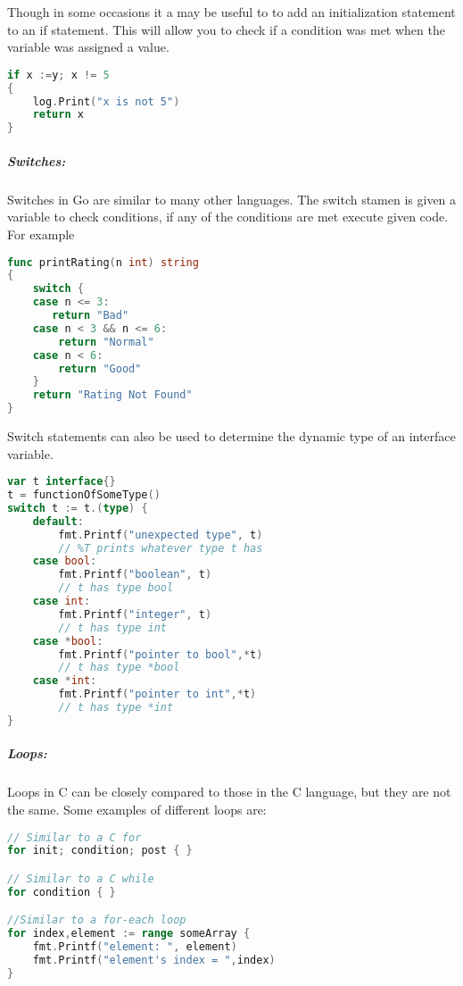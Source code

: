 Though in some occasions it a may be useful to to add an initialization statement to an if statement. This will allow you to check if a condition was met when the variable was assigned a value.
\begin{lstlisting}[language=Go]
if x :=y; x != 5 
{
    log.Print("x is not 5")
    return x
}
\end{lstlisting}
\subparagraph{Switches:}
Switches in Go are similar to many other languages. The switch stamen is given a variable to check conditions, if any of the conditions are met execute given code. For example
\begin{lstlisting}[language=Go]
func printRating(n int) string
{
    switch {
    case n <= 3:
       return "Bad"
    case n < 3 && n <= 6:
        return "Normal"
    case n < 6:
        return "Good"
    }
    return "Rating Not Found"
}
\end{lstlisting}
Switch statements can also be used to determine the dynamic type of an interface variable.\cite{website:go-lang-documentation}
\begin{lstlisting}[language=Go]
var t interface{}
t = functionOfSomeType()
switch t := t.(type) {
    default:
        fmt.Printf("unexpected type", t)     
        // %T prints whatever type t has
    case bool:
        fmt.Printf("boolean", t)             
        // t has type bool
    case int:
        fmt.Printf("integer", t)             
        // t has type int
    case *bool:
        fmt.Printf("pointer to bool",*t) 
        // t has type *bool
    case *int:
        fmt.Printf("pointer to int",*t) 
        // t has type *int
}
\end{lstlisting}
\subparagraph{Loops:} 
Loops in C can be closely compared to those in the C language, but they are not the same. Some  examples of different loops are: \cite{website:go-lang-documentation}
\begin{lstlisting}[language=Go]
// Similar to a C for
for init; condition; post { }

// Similar to a C while
for condition { }

//Similar to a for-each loop
for index,element := range someArray {
    fmt.Printf("element: ", element)
    fmt.Printf("element's index = ",index)
}
\end{lstlisting}



